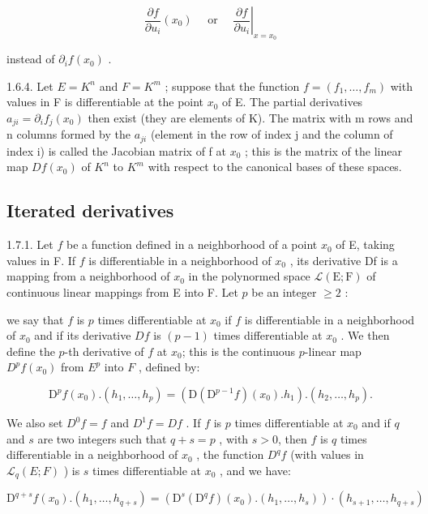 \[
\frac {\partial f}{\partial u _ {i}} \left(x _ {0}\right) \quad \text { or } \quad \left. \frac {\partial f}{\partial u _ {i}} \right| _ {x = x _ {0}}
\]

instead of \(\partial_{i}f(x_{0})\) .

1.6.4. Let \(E = K^{n}\) and \(F = K^{m}\) ; suppose that the function \(f = (f_{1}, \ldots, f_{m})\) with values in F is differentiable at the point \(x_{0}\) of E. The partial derivatives \(a_{ji} = \partial_{i} f_{j}(x_{0})\) then exist (they are elements of K). The matrix with m rows and n columns formed by the \(a_{ji}\) (element in the row of index j and the column of index i) is called the Jacobian matrix of f at \(x_{0}\) ; this is the matrix of the linear map \(Df(x_{0})\) of \(K^{n}\) to \(K^{m}\) with respect to the canonical bases of these spaces.

\subsection{Iterated derivatives}

1.7.1. Let \(f\) be a function defined in a neighborhood of a point \(x_{0}\) of E, taking values in F. If \(f\) is differentiable in a neighborhood of \(x_{0}\) , its derivative Df is a mapping from a neighborhood of \(x_{0}\) in the polynormed space \(\mathcal{L}(\mathrm{E};\mathrm{F})\) of continuous linear mappings from E into F. Let \(p\) be an integer \(\geqslant 2\) :

we say that \(f\) is \(p\) times differentiable at \(x_0\) if \(f\) is differentiable in a neighborhood of \(x_0\) and if its derivative \(Df\) is \((p - 1)\) times differentiable at \(x_0\) . We then define the \(p\)-th derivative of \(f\) at \(x_0\); this is the continuous \(p\)-linear map \(D^p f(x_0)\) from \(E^p\) into \(F\) , defined by:

\[
\mathrm{D} ^ {p} f (x _ {0}). (h _ {1}, \dots , h _ {p}) = (\mathrm{D} (\mathrm{D} ^ {p - 1} f) (x _ {0}). h _ {1}). (h _ {2}, \dots , h _ {p}).
\]

We also set \(D^{0}f = f\) and \(D^{1}f = Df\) . If \(f\) is \(p\) times differentiable at \(x_{0}\) and if \(q\) and \(s\) are two integers such that \(q + s = p\) , with \(s > 0\), then \(f\) is \(q\) times differentiable in a neighborhood of \(x_{0}\) , the function \(D^{q}f\) (with values in \(\mathcal{L}_{q}(E; F)\) ) is \(s\) times differentiable at \(x_{0}\) , and we have:

\[
\mathrm{D} ^ {q + s} f (x _ {0}). (h _ {1}, \dots , h _ {q + s}) = (\mathrm{D} ^ {s} (\mathrm{D} ^ {q} f) (x _ {0}). (h _ {1}, \dots , h _ {s})) \cdot (h _ {s + 1}, \dots , h _ {q + s})
\]


